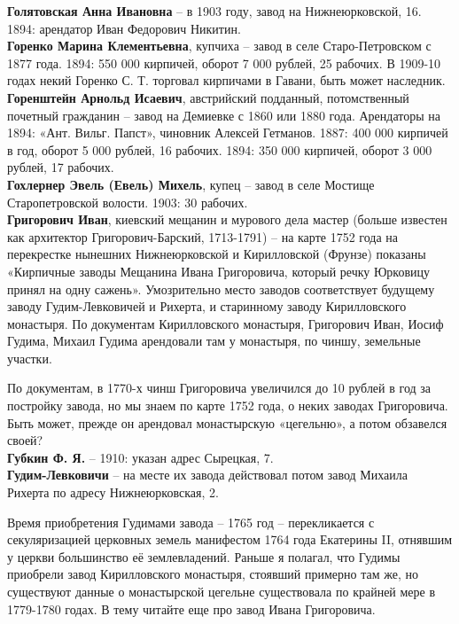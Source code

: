 \noindent\textbf{Голятовская Анна Ивановна} – в 1903 году, завод на Нижнеюрковской, 16. 1894: арендатор Иван Федорович Никитин.\\

\noindent\textbf{Горенко Марина Клементьевна}, купчиха – завод в селе Старо-Петровском с 1877 года. 1894: 550 000 кирпичей, оборот 7 000 рублей, 25 рабочих. В 1909-10 годах некий Горенко С. Т. торговал кирпичами в Гавани, быть может наследник.\\

\noindent\textbf{Горенштейн Арнольд Исаевич}, австрийский подданный, потомственный почетный гражданин – завод на Демиевке с 1860 или 1880 года. Арендаторы на 1894: «Ант. Вильг. Папст», чиновник Алексей Гетманов. 1887: 400 000 кирпичей в год, оборот 5 000 рублей, 16 рабочих. 1894: 350 000 кирпичей, оборот 3 000 рублей, 17 рабочих.\\

\noindent\textbf{Гохлернер Эвель (Евель) Михель}, купец – завод в селе Мостище Старопетровской волости. 1903: 30 рабочих.\\

\noindent\textbf{Григорович Иван}, киевский мещанин и мурового дела мастер (больше известен как архитектор Григорович-Барский, 1713-1791) – на карте 1752 года на перекрестке нынешних Нижнеюрковской и Кирилловской (Фрунзе) показаны «Кирпичные заводы Мещанина Ивана Григоровича, который речку Юрковицу принял на одну сажень». Умозрительно место заводов соответствует будущему заводу Гудим-Левковичей и Рихерта, и старинному заводу Кирилловского монастыря. По документам Кирилловского монастыря, Григорович Иван, Иосиф Гудима, Михаил Гудима арендовали там у монастыря, по чиншу, земельные участки.

По документам, в 1770-х чинш Григоровича увеличился до 10 рублей в год за постройку завода, но мы знаем по карте 1752 года, о неких заводах Григоровича. Быть может, прежде он арендовал монастырскую «цегельню», а потом обзавелся своей?\\

\noindent\textbf{Губкин Ф. Я.} – 1910: указан адрес Сырецкая, 7.\\

\noindent\textbf{Гудим-Левковичи} – на месте их завода действовал потом завод Михаила Рихерта по адресу Нижнеюрковская, 2. 

Время приобретения Гудимами завода – 1765 год – перекликается с секуляризацией церковных земель манифестом 1764 года Екатерины II, отнявшим у церкви большинство её землевладений. Раньше я полагал, что Гудимы приобрели завод Кирилловского монастыря, стоявший примерно там же, но существуют данные о монастырской цегельне существовала по крайней мере в 1779-1780 годах. В тему читайте еще про завод Ивана Григоровича.


